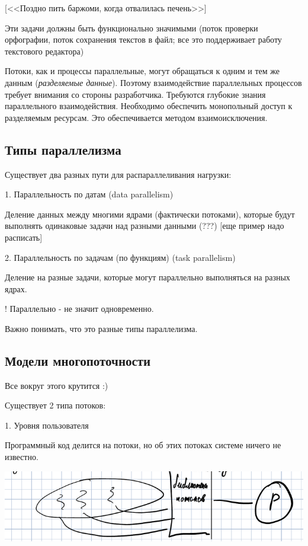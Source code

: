 \documentclass[a4paper, 12pt]{report}
\begin{document}
	[<<Поздно пить баржоми, когда отвалилась печень>>]
	
	Эти задачи должны быть функционально значимыми (поток проверки орфографии, поток сохранения текстов в файл; все это поддерживает работу текстового редактора)
	
	Потоки, как и процессы параллельные, могут обращаться к одним и тем же данным ({\it разделяемые данные}). Поэтому взаимодействие параллельных процессов требует внимания со стороны разработчика. Требуются глубокие знания параллельного взаимодействия. Необходимо обеспечить монопольный доступ к разделяемым ресурсам. Это обеспечивается методом взаимоисключения.
	
	\subsection*{Типы параллелизма}
	
	Существует два разных пути для распараллеливания нагрузки:
	
	1. Параллельность по датам (data parallelism)
	
	Деление данных между многими ядрами (фактически потоками), которые будут выполнять одинаковые задачи над разными данными (???) [еще пример надо расписать]
	
	2. Параллельность по задачам (по функциям) (task parallelism)
	
	Деление на разные задачи, которые могут параллельно выполняться на разных ядрах.
	
	! Параллельно - не значит одновременно.
	
	Важно понимать, что это разные типы параллелизма.
	
	\subsection*{Модели многопоточности}
	
	Все вокруг этого крутится :)
	
	Существует 2 типа потоков:
	
	1. Уровня пользователя
	
	Программный код делится на потоки, но об этих потоках системе ничего не известно.
	
	\includegraphics[width=\linewidth]{5}
	
\end{document}
